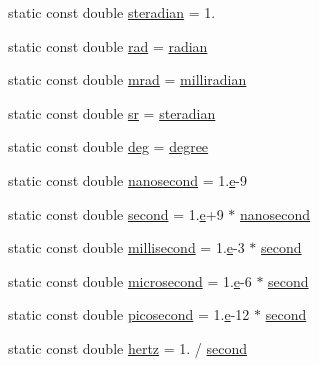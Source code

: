 \begin{DoxyCompactItemize}
\item 
static const double \hyperlink{namespacedd4hep_a0a902cdeced2ad28da2d32515e540867}{steradian} = 1.
\item 
static const double \hyperlink{namespacedd4hep_a9ceaf1c73ffb1a7f13abb23683ac32ba}{rad} = \hyperlink{namespacedd4hep_aa67a6662923dd0138a6bf6713eddcebb}{radian}
\item 
static const double \hyperlink{namespacedd4hep_acc4b11e3d4313ca95a536c6467087bb1}{mrad} = \hyperlink{namespacedd4hep_a7502a4a65dcbf4395be335d0ba214a82}{milliradian}
\item 
static const double \hyperlink{namespacedd4hep_a873790b393da6dc353009c99dfa88b6e}{sr} = \hyperlink{namespacedd4hep_a0a902cdeced2ad28da2d32515e540867}{steradian}
\item 
static const double \hyperlink{namespacedd4hep_a0601e2b88f6f0cccb407192156174957}{deg} = \hyperlink{namespacedd4hep_a9fbc5184e0fbd4235e8efb28cc3ab3af}{degree}
\item 
static const double \hyperlink{namespacedd4hep_acd3d49e76b85c03111a8bdcaffe4c8c7}{nanosecond} = 1.\hyperlink{_volumes_8cpp_a8a9a1f93e9b09afccaec215310e64142}{e}-\/9
\item 
static const double \hyperlink{namespacedd4hep_ac03364576705a245265d8ed6ea26b871}{second} = 1.\hyperlink{_volumes_8cpp_a8a9a1f93e9b09afccaec215310e64142}{e}+9 $\ast$ \hyperlink{namespacedd4hep_acd3d49e76b85c03111a8bdcaffe4c8c7}{nanosecond}
\item 
static const double \hyperlink{namespacedd4hep_ac5b763830694c4ae41e03dc174f1cc79}{millisecond} = 1.\hyperlink{_volumes_8cpp_a8a9a1f93e9b09afccaec215310e64142}{e}-\/3 $\ast$ \hyperlink{namespacedd4hep_ac03364576705a245265d8ed6ea26b871}{second}
\item 
static const double \hyperlink{namespacedd4hep_a82330b93e44ff2e4bc64471f4fb3387d}{microsecond} = 1.\hyperlink{_volumes_8cpp_a8a9a1f93e9b09afccaec215310e64142}{e}-\/6 $\ast$ \hyperlink{namespacedd4hep_ac03364576705a245265d8ed6ea26b871}{second}
\item 
static const double \hyperlink{namespacedd4hep_a0ff865b7e95a5b6116c7a5497895bec3}{picosecond} = 1.\hyperlink{_volumes_8cpp_a8a9a1f93e9b09afccaec215310e64142}{e}-\/12 $\ast$ \hyperlink{namespacedd4hep_ac03364576705a245265d8ed6ea26b871}{second}
\item 
static const double \hyperlink{namespacedd4hep_a5ada76b9ea37d13e1e346f2256017cff}{hertz} = 1. / \hyperlink{namespacedd4hep_ac03364576705a245265d8ed6ea26b871}{second}
\item 

\end{DoxyCompactItemize}
